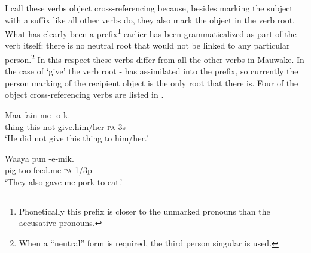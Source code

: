 I call these verbs object cross-referencing because, besides marking the subject with a suffix like all other verbs do, they also  mark the object in the verb root. What has clearly been a prefix\footnote{Phonetically this prefix is closer to the unmarked pronouns than the accusative pronouns.} earlier has been grammaticalized as part of the verb itself: there is no neutral root that would not be linked to any particular person.\footnote{When a ``neutral'' form is required, the third person singular is used.} In this respect these verbs differ from all the other verbs in Mauwake. In the case of `give' the verb root - has assimilated into the prefix, so currently the person marking of the recipient object is the only root that there is. Four of the object cross-referencing verbs are listed in .

\begin{table}
 \caption{Cross-referencing verbs}
\label{tab:3:crossreferencingverbs}
\end{table}


\ea%
\label{ex:3:x334}
\gll Maa fain me -o-k. \\
thing this not give.him/her-\textsc{pa}-3s \\
\glt`He did not give this thing to him/her.'
\z

\ea%
\label{ex:3:x335}
\gll Waaya pun -e-mik. \\
pig too feed.me-\textsc{pa}-1/3p \\
\glt`They also gave me pork to eat.'
\z

